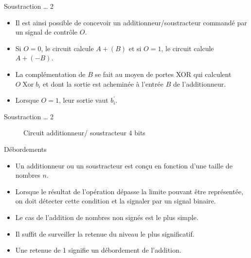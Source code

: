 \documentclass[presentation]{beamer}
\begin{document}
\begin{frame}[label={sec:orgd319f19}]{Soustraction \ldots{} 2}
\begin{itemize}
\item Il est ainsi possible de concevoir un additionneur/soustracteur commandé par un signal de contrôle \(O\).

\item Si \(O=0\), le circuit calcule \(A + (B)\) et si \(O=1\), le circuit calcule \(A + (-B)\).

\item La complémentation de \(B\) se fait au moyen de portes XOR qui calculent \(O \operatorname{Xor} b_i\) et dont la sortie est acheminée à l'entrée \(B\) de l'additionneur.

\item Lorsque \(O=1\), leur sortie vaut \(b_i^\prime\).
\end{itemize}
\end{frame}

\begin{frame}[label={sec:orgce40f0f}]{Soustraction \ldots{} 2}
\begin{figure}[htbp]
\centering

\caption{\label{fig:org2cf5ca6}Circuit additionneur/ soustracteur 4 bits}
\end{figure}
\end{frame}

\begin{frame}[label={sec:org8e0138b}]{Débordements}
\begin{itemize}
\item Un additionneur ou un soustracteur est conçu en fonction d'une taille de nombres \(n\).

\item Lorsque le résultat de l'opération dépasse la limite pouvant être représentée, on doit détecter cette condition et la signaler par un signal binaire.

\item Le cas de l'addition de nombres non signés est le plus simple.

\item Il suffit de surveiller la retenue du niveau le plus significatif.

\item Une retenue de 1 signifie un débordement de l'addition.
\end{itemize}
\end{frame}
\end{document}
